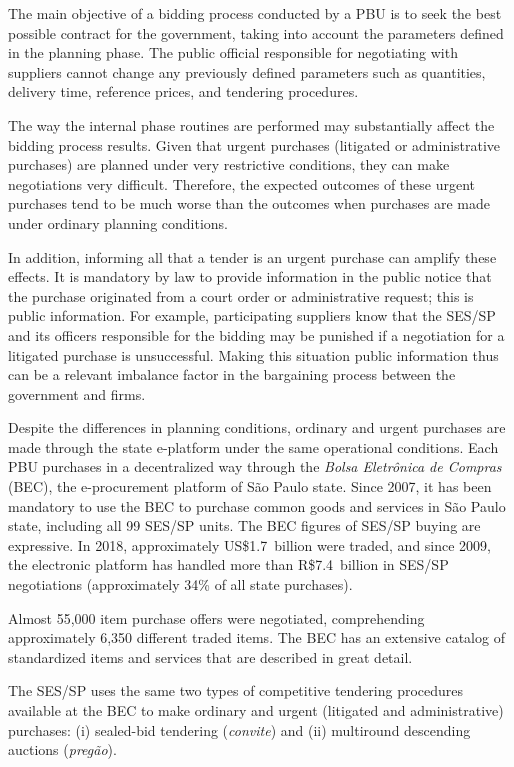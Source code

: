 The main objective of a bidding process conducted by a PBU is to seek the best possible contract for the government, taking into account the parameters defined in the planning phase. The public official responsible for negotiating with suppliers cannot change any previously defined parameters such as quantities, delivery time, reference prices, and tendering procedures.

The way the internal phase routines are performed may substantially affect the bidding process results. Given that urgent purchases (litigated or administrative purchases) are planned under very restrictive conditions, they can make negotiations very difficult. Therefore, the expected outcomes of these urgent purchases tend to be much worse than the outcomes when purchases are made under ordinary planning conditions.

In addition, informing all that a tender is an urgent purchase can amplify these effects. It is mandatory by law to provide information in the public notice that the purchase originated from a court order or administrative request; this is public information. For example, participating suppliers know that the SES/SP and its officers responsible for the bidding may be punished if a negotiation for a litigated purchase is unsuccessful. Making this situation public information thus can be a relevant imbalance factor in the bargaining process between the government and firms.

Despite the differences in planning conditions, ordinary and urgent purchases are made through the state e-platform under the same operational conditions. Each PBU purchases in a decentralized way through the \textit{Bolsa Eletrônica de Compras} (BEC), the e-procurement platform of São Paulo state. Since 2007, it has been mandatory to use the BEC to purchase common goods and services in São Paulo state, including all 99 SES/SP units. The BEC figures of SES/SP buying are expressive. In 2018, approximately US\$1.7~billion were traded, and since 2009, the electronic platform has handled more than R\$7.4~billion in SES/SP negotiations (approximately 34\% of all state purchases).

Almost 55,000 item purchase offers were negotiated, comprehending approximately 6,350 different traded items. The BEC has an extensive catalog of standardized items and services that are described in great detail.

The SES/SP uses the same two types of competitive tendering procedures available at the BEC to make ordinary and urgent (litigated and administrative) purchases: (i) sealed-bid tendering (\textit{convite}) and (ii) multiround descending auctions (\textit{pregão}).

